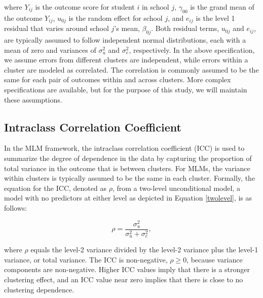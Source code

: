 \noindent where $Y_{ij}$ is the outcome score for student $i$ in school $j$, $\gamma_{00}$ is the grand mean of the outcome $Y_{ij}$, $u_{0j}$ is the random effect for school $j$, and $e_{ij}$ is the level 1 residual that varies around school $j$'s mean, $\beta_{0j}$. Both residual terms,  $u_{0j}$ and $e_{ij}$, are typically assumed to follow independent normal distributions, each with a mean of zero and variances of $\sigma^2_u$ and $\sigma_e^2$, respectively. In the above specification, we assume errors from different clusters are independent, while errors within a cluster are modeled as correlated. The correlation is commonly assumed to be the same for each pair of outcomes within and across clusters. More complex specifications are available, but for the purpose of this study, we will maintain these assumptions.


 
\subsection{Intraclass Correlation Coefficient}
In the MLM framework, the intraclass correlation coefficient (ICC) is used to summarize the degree of dependence in the data by capturing the proportion of total variance in the outcome that is between clusters. For MLMs, the variance within clusters is typically assumed to be the same in each cluster. Formally, the equation for the ICC, denoted as $\rho$, from a two-level unconditional model, a model with no predictors at either level as depicted in Equation \ref{twolevel}, is as follows:
            
\begin{equation}\label{ICC_algebra}
              \rho=\frac{\sigma^2_u}{\sigma^2_u+\sigma^2_e}, 
\end{equation}
            
\noindent where $\rho$ equals the level-2 variance divided by the level-2 variance plus the level-1 variance, or total variance. The ICC is non-negative, $\rho \geq 0$, because variance components are non-negative. Higher ICC values imply that there is a stronger clustering effect, and an ICC value near zero implies that there is close to no clustering dependence. 

